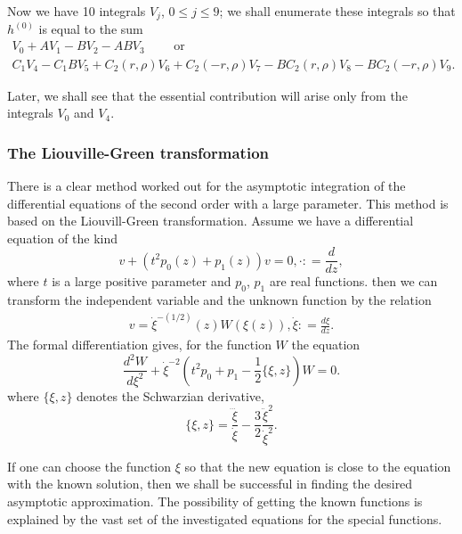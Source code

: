 Now we have 10 integrals $V_j$, $0 \leqslant j \leqslant 9$; we shall enumerate these integrals so that $h^{(0)}$ is equal to the sum
{\fontsize{10}{12}\selectfont
\begin{gather*}
V_0 + A V_1 - B V_2 - ABV_3 \qquad \text{ or } \\
C_1 V_4 -C_1 B V_5 + C_2 (r, \rho) V_6 + C_2 (-r, \rho) V_7 -B C_2 (r, \rho) V_8 - B C_2 (-r, \rho) V_9.
\end{gather*}}

Later, \pageoriginale we shall see that the essential contribution will arise only from the integrals $V_0$ and $V_4$.

\setcounter{section}{2}
\subsubsection{The Liouville-Green transformation}\label{art7-subsubsec2.6.2}
There is a clear method worked out for the asymptotic integration of the differential equations of the second order with a large parameter. This method is based on the Liouvill-Green transformation. Assume we have a differential equation of the kind 
\setcounter{section}{7}
\setcounter{equation}{12}
\begin{equation}
v + (t^2 p_0 (z)+ p_1 (z)) v =0, \cdot : = \frac{d}{dz}, \label{art7-eq7.13}
\end{equation}
where $t$ is a large positive parameter and $p_0$, $p_1$ are real functions. then we can transform the independent variable and the unknown function by the relation
\begin{align}
v = \dot{\xi}^{-(1/2)} (z) W(\xi(z)), \dot{\xi} : = \frac{d\xi}{dz}. \label{art7-eq7.14}
\end{align}
The formal differentiation gives, for the function $W$ the equation
\begin{equation}
\frac{d^2 W}{d\xi^2} + \dot{\xi}^{-2} (t^2 p_0 + p_1 - \frac{1}{2} \{\xi, z\})  W = 0.\label{art7-eq7.15} 
\end{equation}
where $\{\xi, z\}$ denotes the Schwarzian derivative, 
$$
\{\xi,z\} = \frac{\dddot{\xi}}{\dot{\xi}}- \frac{3}{2} \frac{\ddot{\xi}^2}{\dot{\xi}^2}.
$$

If one can choose the function $\xi$ so that the new equation is close to the equation with the known solution, then we shall be successful in finding the desired asymptotic approximation. The possibility of getting the known functions is explained by the vast set of the investigated equations for the special functions.

